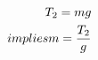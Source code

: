 \documentclass[preview]{standalone}
\begin{document}
\begin{align*}
\special{dvisvgm:raw <g id='unique000'>}T_2 = m g \\implies m = \frac{T_2}{g}\special{dvisvgm:raw </g>}
\end{align*}
\end{document}
